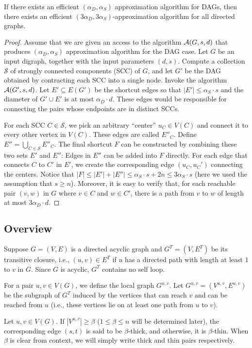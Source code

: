 \begin{lemma}
If there exists an efficient $(\alpha_D,\alpha_S)$ approximation algorithm for DAGs, then there exists an efficient $(3\alpha_D, 3\alpha_S)$-approximation algorithm for all directed graphs.  
\end{lemma}
\begin{proof}
Assume that we are given an access to the algorithm $\mathcal{A}(G,s,d)$ that produces $(\alpha_D,\alpha_S)$ approximation algorithm for the DAG case. 
Let $G$ be an input digraph, together with the input parameters $(d,s)$.  
Compute a collection ${\mathcal S}$ of strongly connected components (SCC) of $G$, and let $G'$ be the DAG obtained by contracting each SCC into a single node. Invoke the algorithm $\mathcal{A}(G',s,d)$. Let $E' \subseteq E(G')$ be the shortcut edges so that $|E'| \leq \alpha_S \cdot s$ and the diameter of $G' \cup E'$ is at most $\alpha_D \cdot d$. 
These edges would be responsible for connecting the pairs whose endpoints are in distinct SCCs. 

For each SCC $C \in {\mathcal S}$, we pick an arbitrary ``center'' $u_C \in V(C)$ and connect it to every other vertex in $V(C)$. These edges are called $E''_C$. Define $E'' = \bigcup_{C \in {\mathcal S}} E''_C$. 
The final shortcut $F$ can be constructed by combining these two sets $E'$ and $E''$: Edges in $E''$ can be added into $F$ directly. For each edge that connects $C$ to $C'$ in $E'$, we create the corresponding edge $(u_C, u_C')$ connecting the centers. Notice that $|F| \leq |E'| + |E''| \leq \alpha_S \cdot s + 2n \leq 3\alpha_S \cdot s$ (here we used the assumption that $s \geq n$). Moreover, it is easy to verify that, for each reachable pair $(v,w)$ in $G$ where $v \in C$ and $w \in C'$, there is a path from $v$ to $w$ of length at most $3 \alpha_D \cdot d$.     
\end{proof}




\subsection{Overview} \label{sec:ub-overview}

Suppose $G=(V,E)$ is a directed acyclic graph and $G^T=(V,E^T)$ be its transitive closure, i.e., $(u,v)\in E^T$ if $u$ has a directed path with length at least $1$ to $v$ in $G$. Since $G$ is acyclic, $G^T$ contains no self loop. 

\begin{definition}\label{def:localgraph}
For a pair $u,v \in V(G)$, we define the local graph $G^{u,v}$. 
 Let $G^{u,v}=(V^{u,v},E^{u,v})$ be the subgraph of $G^T$ induced by the vertices that can reach $v$ and can be reached from $u$ (i.e., these vertices lie on at least one path from $u$ to $v$). 
\end{definition}
\begin{definition}\label{def:thickthinedge}
 Let $u,v \in V(G)$. 
 If $|V^{u,v}|\ge \beta$ ($1\le \beta\le n$ will be determined later), the corresponding edge $(s,t)$ is said to be $\beta$-thick, and otherwise, it is $\beta$-thin. When $\beta$ is clear from context, we will simply write thick and thin pairs respectively. 
\end{definition}

